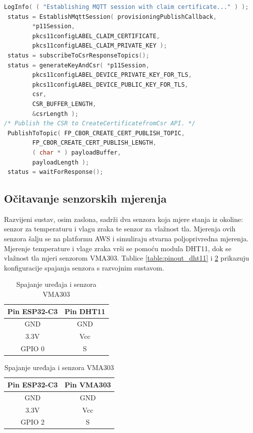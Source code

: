 \begin{lstlisting}[caption={Spajanje certifikatom zahtjeva i zahtjev za novim certifikatom}, language=c]
 LogInfo( ( "Establishing MQTT session with claim certificate..." ) );
 status = EstablishMqttSession( provisioningPublishCallback,
		*p11Session,
		pkcs11configLABEL_CLAIM_CERTIFICATE,
		pkcs11configLABEL_CLAIM_PRIVATE_KEY );
 status = subscribeToCsrResponseTopics();
 status = generateKeyAndCsr( *p11Session,
		pkcs11configLABEL_DEVICE_PRIVATE_KEY_FOR_TLS,
		pkcs11configLABEL_DEVICE_PUBLIC_KEY_FOR_TLS,
		csr,
		CSR_BUFFER_LENGTH,
		&csrLength );
/* Publish the CSR to CreateCertificatefromCsr API. */
 PublishToTopic( FP_CBOR_CREATE_CERT_PUBLISH_TOPIC,
		FP_CBOR_CREATE_CERT_PUBLISH_LENGTH,
		( char * ) payloadBuffer,
		payloadLength );
 status = waitForResponse();
\end{lstlisting}

\subsection{Očitavanje senzorskih mjerenja}

Razvijeni sustav, osim zaslona, sadrži dva senzora koja mjere stanja iz okoline: senzor za temperaturu i vlagu zraka te senzor za vlažnost tla. Mjerenja ovih senzora šalju se na platformu AWS i simuliraju stvarna poljoprivredna mjerenja. Mjerenje temperature i vlage zraka vrši se pomoću modula DHT11, dok se vlažnost tla mjeri senzorom VMA303. Tablice \ref{table:pinout_dht11} i \ref{table:pinout_vma} prikazuju konfiguracije spajanja senzora s razvojnim sustavom. 

\begin{table}[h]
	\centering
	\begin{minipage}{0.45\textwidth}
		\centering
		\begin{tabular}{|c|c|}
			\hline
			\rowcolor{lightblue}  
			\textbf{Pin ESP32-C3} & \textbf{Pin DHT11} \\ \hline
			GND & GND \\ \hline
			3.3V & Vcc \\ \hline
			GPIO 0 & S \\ \hline
		\end{tabular}
		\caption{Spajanje uređaja i modula DHT11}
		\label{table:pinout_dht11}
	\end{minipage}%
	\hspace{0.05\textwidth}
	\begin{minipage}{0.45\textwidth}
		\centering
		\begin{tabular}{|c|c|}
			\hline
			\rowcolor{lightblue}  
			\textbf{Pin ESP32-C3} & \textbf{Pin VMA303} \\ \hline
			GND & GND \\ \hline
			3.3V & Vcc \\ \hline
			GPIO 2 & S \\ \hline
		\end{tabular}
		\caption{Spajanje uređaja i senzora VMA303}
		\label{table:pinout_vma}
	\end{minipage}
\end{table}

